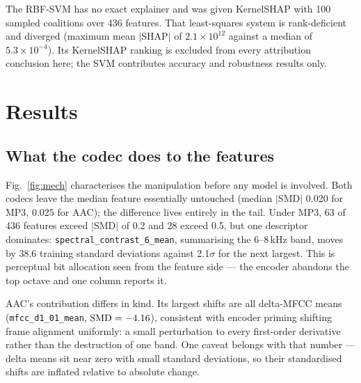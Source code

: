 \documentclass[a4paper,9pt,twocolumn]{extarticle}
\newcommand{\ft}[1]{\texttt{\footnotesize #1}}
\newcommand{\scsix}{\ft{spectral\_contrast\_6\_mean}}
\begin{document}
The RBF-SVM has no exact explainer and was given KernelSHAP with 100 sampled
coalitions over 436 features. That least-squares system is rank-deficient and
diverged (maximum mean $|$SHAP$|$ of $2.1\times10^{12}$ against a median of
$5.3\times10^{-4}$). Its KernelSHAP ranking is excluded from every attribution
conclusion here; the SVM contributes accuracy and robustness results only.

\section{Results}
\subsection{What the codec does to the features}
Fig.~\ref{fig:mech} characterises the manipulation before any model is
involved. Both codecs leave the median feature essentially untouched (median
$|$SMD$|$ 0.020 for MP3, 0.025 for AAC); the difference lives entirely in the
tail. Under MP3, 63 of 436 features exceed $|$SMD$|$ of 0.2 and 28 exceed 0.5,
but one descriptor dominates: \scsix, summarising the 6--8\,kHz band, moves by
38.6 training standard deviations against 2.1$\sigma$ for the next largest.
This is perceptual bit allocation seen from the feature side --- the encoder
abandons the top octave and one column reports it.

AAC's contribution differs in kind. Its largest shifts are all delta-MFCC means
(\ft{mfcc\_d1\_01\_mean}, ${\rm SMD}=-4.16$), consistent with encoder priming
shifting frame alignment uniformly: a small perturbation to every first-order
derivative rather than the destruction of one band. One caveat belongs with
that number --- delta means sit near zero with small standard deviations, so
their standardised shifts are inflated relative to absolute change.
\end{document}
